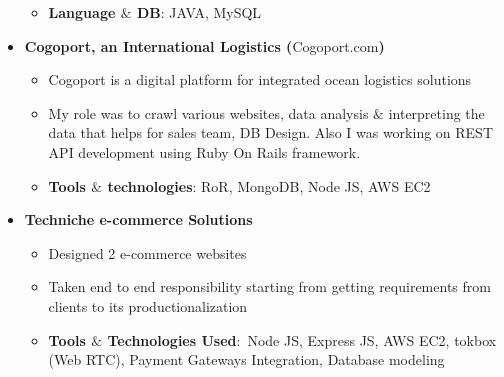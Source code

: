 \documentclass[12pt]{article}
\begin{document}
\begin{itemize}
\begin{itemize}
	\item \textbf{Language $\&$  DB}: JAVA, MySQL\\
\par


\end{itemize}
	\item {\fontsize{14pt}{16.8pt}\selectfont \textbf{Cogoport, an International Logistics (}Cogoport.com\textbf{)}\par}\par

\begin{itemize}
	\item Cogoport is a digital platform for integrated ocean logistics solutions\par

	\item My role was to crawl various websites, data analysis $\&$  interpreting the data that helps for sales team, DB Design. Also I was working on REST API development using Ruby On Rails framework.\par

	\item \textbf{Tools $\&$  technologies}: RoR, MongoDB, Node JS, AWS EC2\\
\par


\end{itemize}
	\item {\fontsize{14pt}{16.8pt}\selectfont \textbf{Techniche e-commerce Solutions}\par}\par

\begin{itemize}
	\item Designed 2 e-commerce websites\par

	\item Taken end to end responsibility starting from getting requirements from clients to its productionalization\par

	\item \textbf{Tools $\&$  Technologies Used}:\ Node JS, Express JS,  AWS EC2, tokbox (Web RTC), Payment Gateways Integration, Database modeling
\end{itemize}
\end{itemize}\par


\vspace{\baselineskip}
\end{document}
